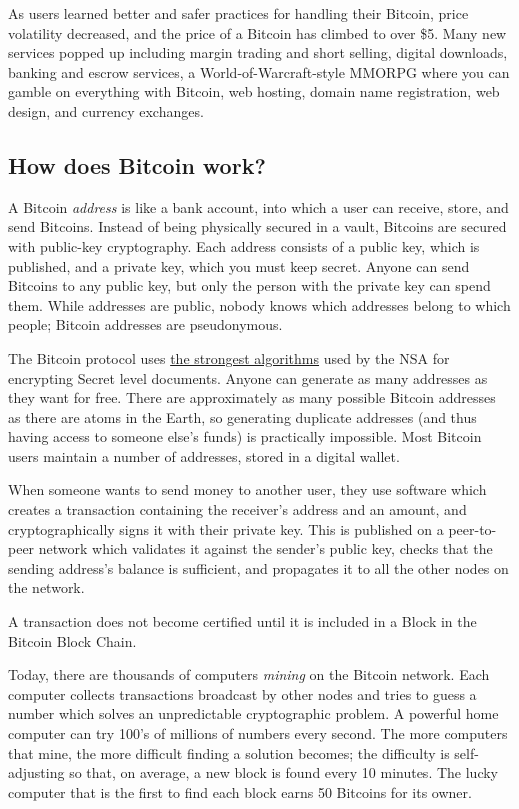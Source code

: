 \documentclass[12pt,twocolumn]{article}
\begin{document}
As users learned better and safer practices for handling their Bitcoin,
price volatility decreased, and the price of a Bitcoin has climbed to
over \$5. Many new services popped up including margin trading and short
selling, digital downloads, banking and escrow services, a
World-of-Warcraft-style MMORPG where you can gamble on everything with
Bitcoin, web hosting, domain name registration, web design, and currency
exchanges.

\subsection{How does Bitcoin work?}

A Bitcoin \emph{address} is like a bank account, into which a user can
receive, store, and send Bitcoins. Instead of being physically secured
in a vault, Bitcoins are secured with public-key cryptography. Each
address consists of a public key, which is published, and a private key,
which you must keep secret. Anyone can send Bitcoins to any public key,
but only the person with the private key can spend them. While addresses
are public, nobody knows which addresses belong to which people; Bitcoin
addresses are pseudonymous.

The Bitcoin protocol uses
\href{http://blog.ezyang.com/2011/06/the-cryptography-of-bitcoin/}{the
strongest algorithms} used by the NSA for encrypting Secret level
documents. Anyone can generate as many addresses as they want for free.
There are approximately as many possible Bitcoin addresses as there are
atoms in the Earth, so generating duplicate addresses (and thus having
access to someone else's funds) is practically impossible. Most Bitcoin
users maintain a number of addresses, stored in a digital wallet.

When someone wants to send money to another user, they use software
which creates a transaction containing the receiver's address and an
amount, and cryptographically signs it with their private key. This is
published on a peer-to-peer network which validates it against the
sender's public key, checks that the sending address's balance is
sufficient, and propagates it to all the other nodes on the network.

A transaction does not become certified until it is included in a Block
in the Bitcoin Block Chain.

Today, there are thousands of computers \emph{mining} on the Bitcoin
network. Each computer collects transactions broadcast by other nodes
and tries to guess a number which solves an unpredictable cryptographic
problem. A powerful home computer can try 100's of millions of numbers
every second. The more computers that mine, the more difficult finding a
solution becomes; the difficulty is self-adjusting so that, on average,
a new block is found every 10 minutes. The lucky computer that is the
first to find each block earns 50 Bitcoins for its owner.
\end{document}
